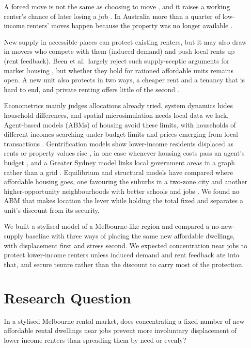\documentclass[10pt,a4paper]{article}
\begin{document}
A forced move is not the same as choosing to move \citep{11}, and it raises a working renter's chance of later losing a job \citep{12}. In Australia more than a quarter of low-income renters' moves happen because the property was no longer available \citep{13}. 

New supply in accessible places can protect existing renters, but it may also draw in movers who compete with them (induced demand) and push local rents up (rent feedback). Been et al.\ largely reject such supply-sceptic arguments for market housing \citep{14}, but whether they hold for rationed affordable units remains open. A new unit also protects in two ways, a cheaper rent and a tenancy that is hard to end, and private renting offers little of the second \citep{13,15}.

Econometrics mainly judges allocations already tried, system dynamics hides household differences, and spatial microsimulation needs local data we lack. Agent-based models (ABMs) of housing avoid these limits, with households of different incomes searching under budget limits and prices emerging from local transactions \citep{16,17}. Gentrification models show lower-income residents displaced as rents or property values rise \citep{18,19}, in one case whenever housing costs pass an agent's budget \citep{20}, and a Greater Sydney model links local government areas in a graph rather than a grid \citep{21}. Equilibrium and structural models have compared where affordable housing goes, one favouring the suburbs in a two-zone city \citep{22} and another higher-opportunity neighbourhoods with better schools and jobs \citep{23}. We found no ABM that makes location the lever while holding the total fixed and separates a unit's discount from its security.

We built a stylised model of a Melbourne-like region and compared a no-new-supply baseline with three ways of placing the same new affordable dwellings, with displacement first and stress second. We expected concentration near jobs to protect lower-income renters unless induced demand and rent feedback ate into that, and secure tenure rather than the discount to carry most of the protection.

\section*{Research Question}

In a stylised Melbourne rental market, does concentrating a fixed number of new affordable rental dwellings near jobs prevent more involuntary displacement of lower-income renters than spreading them by need or evenly?
\end{document}
